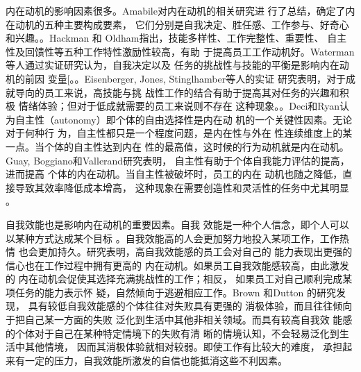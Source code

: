 \documentclass[12pt,a4paper]{ctexart}
\begin{document}
内在动机的影响因素很多。Amabile对内在动机的相关研究进
行了总结，确定了内在动机的五种主要构成要素，
它们分别是自我决定、胜任感、工作参与、好奇心
和兴趣\cite{amabile1996cc}。。Hackman 和
Oldham指出，技能多样性、工作完整性、重要性、
自主性及回馈性等五种工作特性激励性较高，有助
于提高员工工作动机好\cite{hackman1975djd}。Waterman等人通过实证研究认为，自我决定以及
任务的挑战性与技能的平衡是影响内在动机的前因
变量[\cite{AlanSWaterman11012003}。。Eisenberger, Jones, Stinglhamber等人的实证
研究表明，对于成就导向的员工来说，高技能与挑
战性工作的结合有助于提高其对任务的兴趣和积极
情绪体验；但对于低成就需要的员工来说则不存在
这种现象\cite{Eisenberger2005}。。Deci和Ryan认为自主性（autonomy）即个体的自由选择性是内在动
机的一个关键性因素。无论对于何种行
为，自主性都只是一个程度问题，是内在性与外在
性连续维度上的某一点。当个体的自主性达到内在
性的最高值，这时候的行为动机就是内在动机\cite{ryan2000sdt}。Guay, Boggiano和Vallerand研究表明，
自主性有助于个体自我能力评估的提高，进而提高
个体的内在动机。当自主性被破坏时，员工的内在
动机也随之降低，直接导致其效率降低成本增高，
这种现象在需要创造性和灵活性的任务中尤其明显
\cite{FredericGuay06012001}。

自我效能也是影响内在动机的重要因素。自我
效能是一种个人信念，即个人可以以某种方式达成某个目标
\cite{ormrod2003epd}。自我效能高的人会更加努力地投入某项工作，工作热情
也会更加持久\cite{schunk1990gsa}。研究表明，高自我效能感的员工会对自己的
能力表现出更强的信心也在工作过程中拥有更高的
内在动机。如果员工自我效能感较高，由此激发的
内在动机会促使其选择充满挑战性的工作；相反，
如果员工对自己顺利完成某项任务的能力表示怀
疑，自然倾向于逃避相应工作\cite{David2007}\cite{bandura2003nse}。Brown 和Dutton 的研究发现，
具有较低自我效能感的个体往往对失败具有更强的
消极体验，而且往往倾向于把自己某一方面的失败
泛化到生活中其他非相关领域。而具有较高自我效
能感的个体对于自己在某种特定情境下的失败有清
晰的情境认知，不会轻易泛化到生活中其他情境，
因而其消极体验就相对较弱\cite{brown1995tvc}。即使工作有比较大的难度，
承担起来有一定的压力，自我效能所激发的自信也能抵消这些不利因素。
\end{document}
